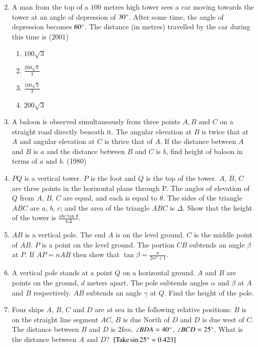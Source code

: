 \begin{enumerate}[label=\thesubsection.\arabic*,ref=\thesubsection.\theenumi]
\begin{multicols}{2}
\begin{enumerate}
\end{enumerate}
	    \end{multicols}
%
\item A man from the top of a $100$ metres high tower sees a car moving towards the tower at an angle of depression of $30\degree$. After some time, the angle of depression becomes $60\degree$. The distance (in metres) travelled by the car during this time is
\hfill (2001)
	    \begin{multicols}{4}    
\begin{enumerate}
\item $100\sqrt{3}$
\item $\frac{200\sqrt{3}}{3}$
\item $\frac{100\sqrt{3}}{3}$
\item $200\sqrt{3}$
\end{enumerate}
	    \end{multicols}
     	\item A baloon is observed simultaneously from three points ${A},{B} \text{ and } {C}$ on a straight road directly beneath it. The angular elevation at ${B}$ is twice that at ${A}$ and angular elevation at ${C}$ is thrice that of ${A}$. If the distance between ${A}$ and ${B}$ is $a$ and the distance between ${B}$ and ${C}$ is $b$, find height of baloon in terms of $a \text{ and } b$.
     \hfill {(1980)}
\item $PQ$ is a vertical tower. $P$ is the foot and $Q$ is the top of the tower. $A$, $B$, $C$ are three points in the horizontal plane through P. The angles of elevation of $Q$ from $A$, $B$, $C$ are equal, and each is equal to $\theta$. The sides of the triangle $ABC$ are $a$, $b$, $c$; and the area of the triangle $ABC$ is $\Delta$. Show that the height of the tower is $\frac{abc\tan{\theta}}{4\Delta}$.
\item $AB$ is a vertical pole. The end $A$ is on the level ground. $C$ is the middle point of $AB$. $P$ is a point on the level ground. The portion $CB$ subtends an angle $\beta$ at $P$. If $AP=nAB$ then show that $\tan{\beta}=\frac{n}{2n^2+1}$.
%
\hfill{}
\item A vertical pole stands at a point $Q$ on a horizontal ground. $A$ and $B$ are points on the ground, $d$ meters apart. The pole subtends angles $\alpha$ and $\beta$ at $A$ and $B$ respectively. $AB$ subtends an angle $\gamma$ at $Q$. Find the height of the pole. 
%
\hfill{}
%
\item Four ships $A$, $B$, $C$ and $D$ are at sea in the following relative positions: $B$ is on the straight line segment $AC$, $B$ is due North of $D$ and $D$ is due west of $C$. The distance between $B$ and $D$ is $2 km$. $\angle{BDA}=40\degree$, $\angle{BCD}=25\degree$. What is the distance between $A$ and $D$? ${}\left[\text{Take} \sin{25\degree}=0.423\right]$

\end{enumerate}
